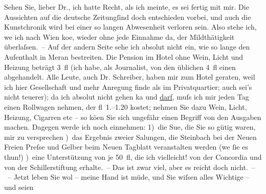 \begin{ledgroupsized}[t]{13cm}
           \pstart
           Sehen Sie, lieber Dr., ich hatte Recht, als ich meinte, es sei fertig mit mir. Die
               Aussichten auf die deutsche Zeitungſind doch entschieden vorbei, und auch die Kunstchronik wird bei einer so langen Abwesenheit
               verloren sein. Also stehe ich, we{\geminationn} ich nach Wien ko{\geminationm}e, wieder ohne
               jede Einnahme da, der Mildthätigkeit überlaſsen. – Auf der andern Seite sehe ich
               absolut nicht ein, wie so lange den Aufenthalt in Meran bestreiten. Die Pension im Hotel ohne Wein, Licht und Heizung beträgt
               3 fl (ich habe, als Journalist, von den üblichen 4 fl einen abgehandelt. Alle Leute,
               auch Dr. Schreiber, haben mir zum Hotel
               geraten, weil ich hier Gesellschaft und mehr Anregung finde als im Privatquartier;
               auch sei’s nicht teuerer); da ich absolut nicht gehen ka{\geminationn} und \uline{darf}, muſs ich mir jeden Tag einen Rollwagen
               nehmen, der fl 1.–1.20 kostet; nehmen Sie dazu Wein, Licht, Heizung, Cigarren etc –
               so kö{\geminationn}en Sie sich ungefähr einen Begriff von den
               Ausgaben machen. Dagegen werde ich noch einnehmen: \pend
           \pstart
           {\pb}1) die Su{\geminationm}e, die
               Sie so gütig waren, mir zu versprechen\pend
           ) das Ergebnis zweier Sa{\geminationm}lungen, die Steinbach bei der Neuen Freien Preſse und Gelber beim Neuen Tagblatt veranstalten
               werden (we{\geminationn}{ }ſie es thun!)\pend
           ) eine Unterstützung von je 50 fl, die ich vielleicht! von der Concordia und von der Schillerstiftung erhalte. – Das ist zwar viel, aber es reicht doch
               nicht. – –\pend
           \pstart
           Jetzt leben Sie wol – meine Hand ist müde, und Sie wiſsen alles Wichtige – und seien

\end{ledgroupsized}
